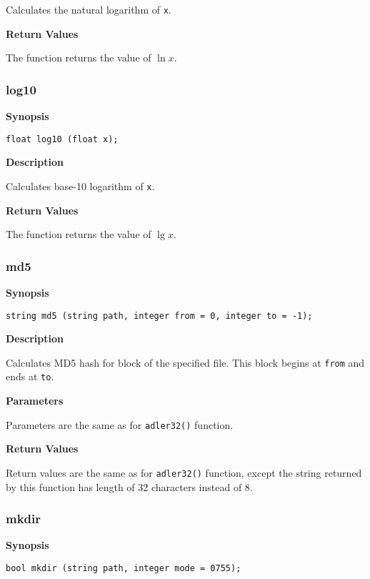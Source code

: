 \documentclass[a4paper, 10pt, titlepage]{article}
\begin{document}
Calculates the natural logarithm of \texttt{x}.

\textbf{Return Values}

The function returns the value of $\ln{x}$.

\subsubsection{log10}

\textbf{Synopsis}

\begin{verbatim}
float log10 (float x);
\end{verbatim}

\textbf{Description}

Calculates base-10 logarithm of \texttt{x}.

\textbf{Return Values}

The function returns the value of $\lg{x}$.

\subsubsection{md5}

\textbf{Synopsis}

\begin{verbatim}
string md5 (string path, integer from = 0, integer to = -1);
\end{verbatim}

\textbf{Description}

Calculates MD5 hash for block of the specified file. This block begins at \texttt{from} and ends at \texttt{to}.

\textbf{Parameters}

Parameters are the same as for \texttt{adler32()} function.

\textbf{Return Values}

Return values are the same as for \texttt{adler32()} function, except the string returned by this function has length of 32 characters instead of 8.

\subsubsection{mkdir}

\textbf{Synopsis}

\begin{verbatim}
bool mkdir (string path, integer mode = 0755);
\end{verbatim}
\end{document}
